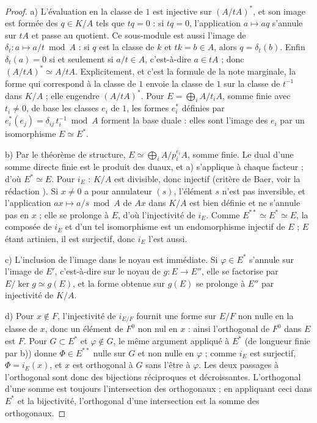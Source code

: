 \begin{proof}
a) L'évaluation en la classe de $1$ est injective sur $(A/tA)^{*}$, et son image est formée des $q \in K/A$ tels que $tq = 0$ : si $tq = 0$, l'application $a \mapsto aq$ s'annule sur $tA$ et passe au quotient. Ce sous-module est aussi l'image de $\delta_t \colon a \mapsto a/t \bmod A$ : si $q$ est la classe de $k$ et $tk = b \in A$, alors $q = \delta_t(b)$. Enfin $\delta_t(a) = 0$ si et seulement si $a/t \in A$, c'est-à-dire $a \in tA$ ; donc $(A/tA)^{*} \simeq A/tA$. Explicitement, et c'est la formule de la note marginale, la forme qui correspond à la classe de $1$ envoie la classe de $1$ sur la classe de $t^{-1}$ dans $K/A$ ; elle engendre $(A/tA)^{*}$. Pour $E = \bigoplus_i A/t_iA$, somme finie avec $t_i \neq 0$, de base les classes $e_i$ de $1$, les formes $e_i^{*}$ définies par $e_i^{*}(e_j) = \delta_{ij}\, t_i^{-1} \bmod A$ forment la base duale : elles sont l'image des $e_i$ par un isomorphisme $E \simeq E^{*}$.

b) Par le théorème de structure, $E \simeq \bigoplus_i A/p_i^{e_i}A$, somme finie. Le dual d'une somme directe finie est le produit des duaux, et a) s'applique à chaque facteur ; d'où $E^{*} \simeq E$. Pour $i_E$ : $K/A$ est divisible, donc injectif (critère de Baer, voir la rédaction ). Si $x \neq 0$ a pour annulateur $(s)$, l'élément $s$ n'est pas inversible, et l'application $ax \mapsto a/s \bmod A$ de $Ax$ dans $K/A$ est bien définie et ne s'annule pas en $x$ ; elle se prolonge à $E$, d'où l'injectivité de $i_E$. Comme $E^{**} \simeq E^{*} \simeq E$, la composée de $i_E$ et d'un tel isomorphisme est un endomorphisme injectif de $E$ ; $E$ étant artinien, il est surjectif, donc $i_E$ l'est aussi.

c) L'inclusion de l'image dans le noyau est immédiate. Si $\varphi \in E^{*}$ s'annule sur l'image de $E'$, c'est-à-dire sur le noyau de $g \colon E \to E''$, elle se factorise par $E/\ker g \simeq g(E)$, et la forme obtenue sur $g(E)$ se prolonge à $E''$ par injectivité de $K/A$.

d) Pour $x \notin F$, l'injectivité de $i_{E/F}$ fournit une forme sur $E/F$ non nulle en la classe de $x$, donc un élément de $F^{0}$ non nul en $x$ : ainsi l'orthogonal de $F^{0}$ dans $E$ est $F$. Pour $G \subset E^{*}$ et $\varphi \notin G$, le même argument appliqué à $E^{*}$ (de longueur finie par b)) donne $\Phi \in E^{**}$ nulle sur $G$ et non nulle en $\varphi$ ; comme $i_E$ est surjectif, $\Phi = i_E(x)$, et $x$ est orthogonal à $G$ sans l'être à $\varphi$. Les deux passages à l'orthogonal sont donc des bijections réciproques et décroissantes. L'orthogonal d'une somme est toujours l'intersection des orthogonaux ; en appliquant ceci dans $E^{*}$ et la bijectivité, l'orthogonal d'une intersection est la somme des orthogonaux.
\end{proof}

